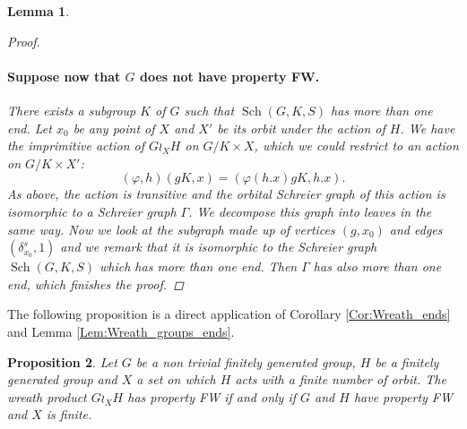 \documentclass[a4paper]{article}
\newtheorem{lem}{Lemma}[section]
\newtheorem{prop}[lem]{Proposition}
\theoremstyle{definition}
\theoremstyle{remark}%
\DeclareMathOperator\Sch{Sch}
\begin{document}
\begin{lem}
\begin{proof}
\paragraph{Suppose now that $G$ does not have property FW.} There exists a subgroup $K$ of $G$ such that $\Sch(G,K,S)$ has more than one end.
Let $x_0$ be any point of $X$ and $X'$ be its orbit under the action of $H$.
We have the imprimitive action of $G\wr_XH$ on $G/K\times X$, which we could restrict to an action on $G/K\times X'$:
\[
(\varphi,h)(gK,x) = (\varphi(h.x) gK, h.x).
\]
As above, the action is transitive and the orbital Schreier graph of this action is isomorphic to a Schreier graph $\Gamma$. We decompose this graph into leaves in the same way. Now we look at the subgraph made up of vertices $(g,x_0)$ and edges $(\delta_{x_0}^s,1)$ and we remark that it is isomorphic to the Schreier graph $\Sch(G,K,S)$ which has more than one end. Then $\Gamma$ has also more than one end, which finishes the proof.
\end{proof}
\end{lem}
%
%
The following proposition is a direct application of Corollary \ref{Cor:Wreath_ends} and Lemma \ref{Lem:Wreath_groups_ends}.
%
%
\begin{prop}
Let $G$ be a non trivial finitely generated group, $H$ be a finitely generated group and $X$ a set on which $H$ acts with a finite number of orbit. The wreath product $G \wr_X H$ has property FW if and only if $G$ and $H$ have property FW and $X$ is finite.
\end{prop}
%
%













\enddocument
\end{document}
